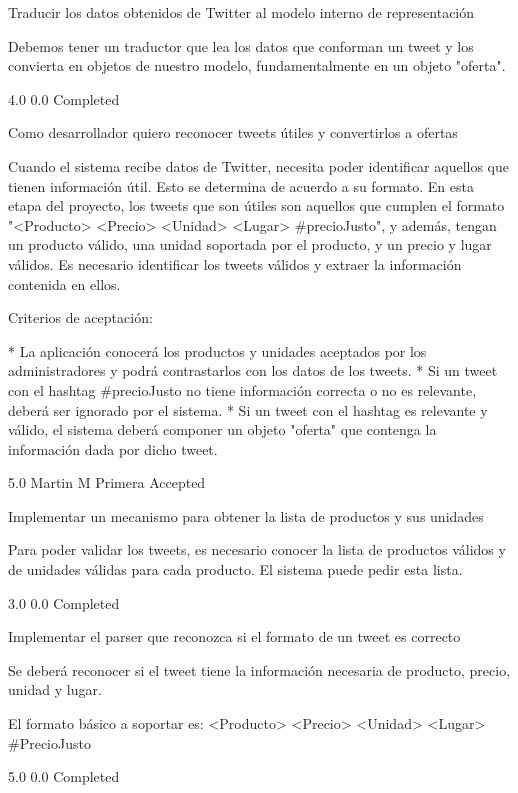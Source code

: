 		{Traducir los datos obtenidos de Twitter al modelo interno de representación} %
		{Debemos tener un traductor que lea los datos que conforman un tweet y los
convierta en objetos de nuestro modelo, fundamentalmente en un objeto
"oferta".

} %
		{4.0} %
		{} %
		{0.0} %
		{Completed} %


\vspace{20pt}

	{Como desarrollador quiero reconocer tweets útiles y convertirlos a ofertas} %
	{Cuando el sistema recibe datos de Twitter, necesita poder identificar aquellos
que tienen información útil. Esto se determina de acuerdo a su formato. En
esta etapa del proyecto, los tweets que son útiles son aquellos que cumplen el
formato "<Producto> <Precio> <Unidad> <Lugar> #precioJusto", y además, tengan
un producto válido, una unidad soportada por el producto, y un precio y lugar
válidos. Es necesario identificar los tweets válidos y extraer la información
contenida en ellos.

  
Criterios de aceptación:

* La aplicación conocerá los productos y unidades aceptados por los administradores y podrá contrastarlos con los datos de los tweets.  
* Si un tweet con el hashtag #precioJusto no tiene información correcta o no es relevante, deberá ser ignorado por el sistema.  
* Si un tweet con el hashtag es relevante y válido, el sistema deberá componer un objeto "oferta" que contenga la información dada por dicho tweet.

} %
	{} %
	{5.0} %
	{Martin M} %
	{Primera} %
	{Accepted} %

		{Implementar un mecanismo para obtener la lista de productos y sus unidades} %
		{Para poder validar los tweets, es necesario conocer la lista de productos
válidos y de unidades válidas para cada producto. El sistema puede pedir esta
lista.

} %
		{3.0} %
		{} %
		{0.0} %
		{Completed} %

		{Implementar el parser que reconozca si el formato de un tweet es correcto} %
		{Se deberá reconocer si el tweet tiene la información necesaria de producto,
precio, unidad y lugar.

El formato básico a soportar es: <Producto> <Precio> <Unidad> <Lugar>
#PrecioJusto

} %
		{5.0} %
		{} %
		{0.0} %
		{Completed} %

